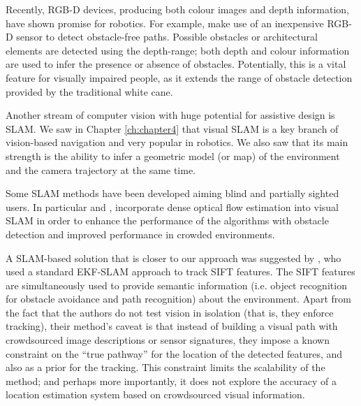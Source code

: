 Recently, RGB-D devices, producing both colour images and depth information, have shown promise for robotics. For example, \citet{aladren2014navigation} make use of an inexpensive RGB-D sensor to detect obstacle-free paths. Possible obstacles or architectural elements are detected using the depth-range; both depth and colour information are used to infer the presence or absence of obstacles. Potentially, this is a vital feature for visually impaired people, as it extends the range of obstacle detection provided by the traditional white cane.


Another stream of computer vision with huge potential for assistive design is SLAM. We saw in Chapter \ref{ch:chapter4} that visual SLAM is a key branch of vision-based navigation and very popular in robotics. We also saw that its main strength is the ability to infer a geometric model (or map) of the environment and the camera trajectory at the same time. 

Some SLAM methods have been developed aiming blind and partially sighted users. In particular \cite{alcantarilla2010visual} and \cite{alcantarilla2012combining}, incorporate dense optical flow estimation into visual SLAM in order to enhance the performance of the algorithms with obstacle detection and improved performance in crowded environments.



A SLAM-based solution that is closer to our approach was suggested by \citet{ali2010indoor}, who used a standard EKF-SLAM approach to track SIFT features. The SIFT features are simultaneously used to provide semantic information (i.e. object recognition for obstacle avoidance and path recognition) about the environment. Apart from the fact that the authors do not test vision in isolation (that is, they enforce tracking), their method's caveat is that instead of building a visual path with crowdsourced image descriptions or sensor signatures, they impose a known constraint on the ``true pathway'' for the location of the detected features, and also as a prior for the tracking. This constraint limits the scalability of the method; and perhaps more importantly, it does not explore the accuracy of a location estimation system based on crowdsourced visual information.

